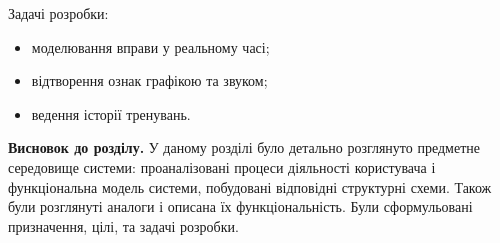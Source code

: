 Задачі розробки:
\begin{itemize}
  \item моделювання вправи у реальному часі;
  \item відтворення ознак графікою та звуком;
  \item ведення історії тренувань.
\end{itemize}

\textbf{Висновок до розділу.} У даному розділі було детально розглянуто предметне середовище системи: проаналізовані процеси діяльності користувача і функціональна модель системи, побудовані відповідні структурні схеми. Також були розглянуті аналоги і описана їх функціональність. Були сформульовані призначення, цілі, та задачі розробки.